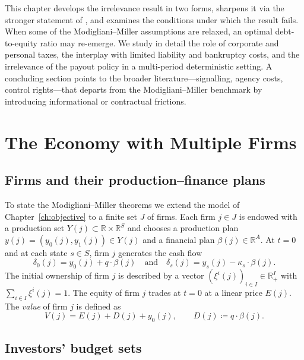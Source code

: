 \documentclass[11pt,a4paper,oneside]{book}
\def\R{\mathbb{R}}
\def\et{\quad \text{and} \quad}
\theoremstyle{plain}
\theoremstyle{definition}
\theoremstyle{remark}
\numberwithin{equation}{chapter}
\begin{document}
This chapter develops the irrelevance result in two forms, sharpens it via the stronger statement of \citet{Stiglitz1969, Stiglitz1974}, and examines the conditions under which the result fails.
When some of the Modigliani--Miller assumptions are relaxed, an optimal debt-to-equity ratio may re-emerge.
We study in detail the role of corporate and personal taxes, the interplay with limited liability and bankruptcy costs, and the irrelevance of the payout policy in a multi-period deterministic setting.
A concluding section points to the broader literature---signalling, agency costs, control rights---that departs from the Modigliani--Miller benchmark by introducing informational or contractual frictions.

\section{The Economy with Multiple Firms}
\label{sec:multi-firm}

\subsection{Firms and their production--finance plans}

To state the Modigliani--Miller theorems we extend the model of Chapter~\ref{ch:objective} to a finite set $J$ of firms.
Each firm $j \in J$ is endowed with a production set $Y(j) \subset \R \times \R^S$ and chooses a production plan $y(j) = (y_0(j), y_1(j)) \in Y(j)$ and a financial plan $\beta(j) \in \R^A$.
At $t=0$ and at each state $s \in S$, firm $j$ generates the cash flow
\begin{equation}\label{eq:cash-flow-multi}
  \delta_0(j) = y_0(j) + q \cdot \beta(j)
  \et
  \delta_s(j) = y_s(j) - \kappa_s \cdot \beta(j).
\end{equation}
The initial ownership of firm $j$ is described by a vector $(\xi^i(j))_{i \in I} \in \R_+^I$ with $\sum_{i \in I} \xi^i(j) = 1$.
The equity of firm $j$ trades at $t=0$ at a linear price $E(j)$.
The \emph{value} of firm $j$ is defined as
\begin{equation}\label{eq:firm-value-multi}
  V(j) = E(j) + D(j) + y_0(j),
  \qquad
  D(j) \coloneqq q \cdot \beta(j).
\end{equation}

\subsection{Investors' budget sets}
\end{document}
